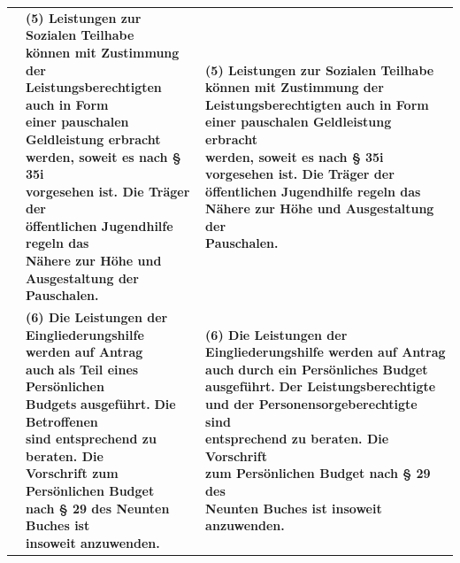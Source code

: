 \documentclass[10pt,a4paper,landscape]{article}
\begin{document}
\begin{longtable}{|L{8.2cm}|L{8.2cm}|L{8.2cm}|}
\hhline{|---|}
 & \textbf{(5) Leistungen zur Sozialen Teilhabe  \newline können mit Zustimmung der  \newline Leistungsberechtigten auch in Form  \newline einer pauschalen Geldleistung erbracht  \newline werden, soweit es nach \S{} 35i  \newline vorgesehen ist. Die Träger der  \newline öffentlichen Jugendhilfe regeln das  \newline Nähere zur Höhe und Ausgestaltung der  \newline Pauschalen. } & \textbf{(5) Leistungen zur Sozialen Teilhabe  \newline können mit Zustimmung der  \newline Leistungsberechtigten auch in Form } \textbf{einer pauschalen Geldleistung erbracht  \newline werden, soweit es nach \S{} 35i  \newline vorgesehen ist. Die Träger der  \newline öffentlichen Jugendhilfe regeln das  \newline Nähere zur Höhe und Ausgestaltung der  \newline Pauschalen. } \\
\hhline{|---|}
 & \textbf{(6) Die Leistungen der  \newline Eingliederungshilfe werden auf Antrag  \newline auch }\textbf{\textcolor{diffred}{als Teil eines Persönlichen  \newline Budgets}}\textbf{ ausgeführt. }\textbf{\textcolor{diffred}{Die Betroffenen}}\textbf{  \newline sind entsprechend zu beraten. Die  \newline Vorschrift zum Persönlichen Budget  \newline nach \S{} 29 des Neunten Buches ist  \newline insoweit anzuwenden. } & \textbf{(6) Die Leistungen der  \newline Eingliederungshilfe werden auf Antrag  \newline auch }\textbf{\textcolor{diffgreen}{durch ein Persönliches Budget}}\textbf{  \newline ausgeführt. }\textbf{\textcolor{diffgreen}{Der Leistungsberechtigte  \newline und der Personensorgeberechtigte}}\textbf{ sind  \newline entsprechend zu beraten. Die Vorschrift  \newline zum Persönlichen Budget nach \S{} 29 des  \newline Neunten Buches ist insoweit  \newline anzuwenden.  } \\

\end{longtable}
\end{document}
